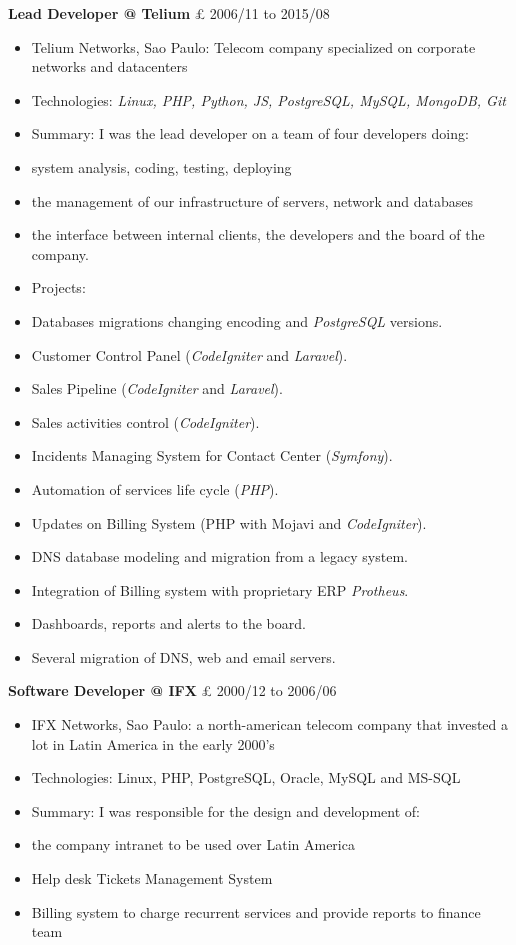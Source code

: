 \documentclass[margin,a4paper]{res}
\begin{document}
{\textbf{Lead Developer @ Telium} £ 2006/11 to 2015/08

\begin{itemize}
\itemsep1pt\parskip0pt
\item
  Telium Networks, Sao Paulo: Telecom company specialized on corporate
  networks and datacenters
\item
  Technologies: \emph{Linux, PHP, Python, JS, PostgreSQL, MySQL,
  MongoDB, Git}
\item
  Summary: I was the lead developer on a team of four developers doing:
\item
  system analysis, coding, testing, deploying
\item
  the management of our infrastructure of servers, network and databases
\item
  the interface between internal clients, the developers and the board
  of the company.
\item
  Projects:
\item
  Databases migrations changing encoding and \emph{PostgreSQL} versions.
\item
  Customer Control Panel (\emph{CodeIgniter} and \emph{Laravel}).
\item
  Sales Pipeline (\emph{CodeIgniter} and \emph{Laravel}).
\item
  Sales activities control (\emph{CodeIgniter}).
\item
  Incidents Managing System for Contact Center (\emph{Symfony}).
\item
  Automation of services life cycle (\emph{PHP}).
\item
  Updates on Billing System (PHP with Mojavi and \emph{CodeIgniter}).
\item
  DNS database modeling and migration from a legacy system.
\item
  Integration of Billing system with proprietary ERP \emph{Protheus}.
\item
  Dashboards, reports and alerts to the board.
\item
  Several migration of DNS, web and email servers.
\end{itemize}

\textbf{Software Developer @ IFX} £ 2000/12 to 2006/06

\begin{itemize}
\itemsep1pt\parskip0pt
\item
  IFX Networks, Sao Paulo: a north-american telecom company that
  invested a lot in Latin America in the early 2000's
\item
  Technologies: Linux, PHP, PostgreSQL, Oracle, MySQL and MS-SQL
\item
  Summary: I was responsible for the design and development of:
\item
  the company intranet to be used over Latin America
\item
  Help desk Tickets Management System
\item
  Billing system to charge recurrent services and provide reports to
  finance team
\end{itemize}

}
\end{document}
